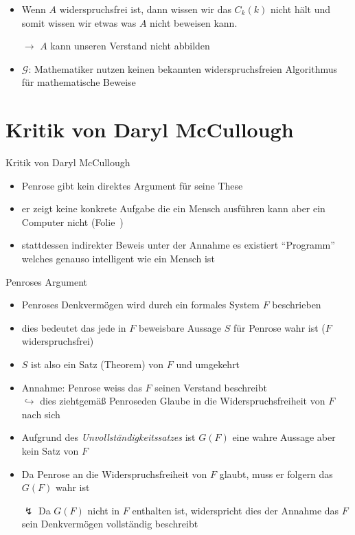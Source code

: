 \begin{frame}
    \begin{itemize}
        \item Wenn $A$ widerspruchsfrei ist, dann wissen wir das $C_k(k)$ nicht hält und somit wissen wir etwas was $A$ nicht beweisen kann.
        \item[$\rightarrow$] $A$ kann unseren Verstand nicht abbilden
        \item $\mathscr{G}$: Mathematiker nutzen keinen bekannten widerspruchsfreien Algorithmus für mathematische Beweise
    \end{itemize}
\end{frame}

%
%

\section{Kritik von Daryl McCullough}
\label{sec:critic_mccullough}


\begin{frame}{Kritik von Daryl McCullough \cite{mccullough1995can}}
    \begin{itemize}
        \item Penrose gibt kein direktes Argument für seine These
        \item er zeigt keine konkrete Aufgabe die ein Mensch ausführen kann aber ein Computer nicht (Folie~\pageref{sec:visual_proof})
        \item stattdessen indirekter Beweis unter der Annahme es existiert \enquote{Programm} welches genauso intelligent wie ein Mensch ist
    \end{itemize}
\end{frame}

\begin{frame}{Penroses Argument}
\label{sec:penrose_argument}
    \begin{itemize}
        \item Penroses Denkvermögen wird durch ein formales System $F$ beschrieben
        \item dies bedeutet das jede in $F$ beweisbare Aussage $S$ für Penrose wahr ist ($F$ widerspruchsfrei)
        \item $S$ ist also ein Satz (Theorem) von $F$ und umgekehrt
        \item Annahme: Penrose weiss das $F$ seinen Verstand beschreibt\\
        $\hookrightarrow$ dies zieht\textemdash{}gemäß Penrose\textemdash{}den Glaube in die Widerspruchsfreiheit von $F$ nach sich
        \item Aufgrund des \emph{Unvollständigkeitssatzes} ist $G(F)$ eine wahre Aussage aber kein Satz von $F$
        \item Da Penrose an die Widerspruchsfreiheit von $F$ glaubt, muss er folgern das $G(F)$ wahr ist
        \item[$\lightning$] Da $G(F)$ nicht in $F$ enthalten ist, widerspricht dies der Annahme das $F$ sein Denkvermögen vollständig beschreibt
    \end{itemize}
\end{frame}

